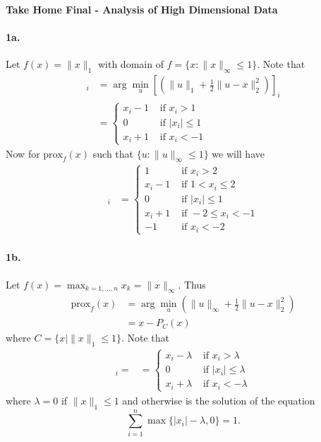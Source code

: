 \documentclass[12pt, leqno]{article}
\providecommand{\abs}[1]{\lvert#1\rvert}
\providecommand{\norm}[1]{\lVert#1\rVert}
\newcommand{\prox}{\mathrm{prox}}
\begin{document}
\pagestyle{fancy}

\begin{center}
{\large {\bf Take Home Final - Analysis of High Dimensional Data}} \\
\end{center}

\paragraph{1a.} Let $f(x) = \norm{x}_1$ with domain of $f =
\{x:\norm{x}_{\infty} \leq 1\}$. 
Note that 
\begin{align*}
  [\prox_{f}(x)]_i &= \arg\min_{u}[(\norm{u}_1 + \frac{1}{2} \norm{u-x}_2^2)]_i\\
  &= \begin{cases} x_i-1 & \text{ if } x_i>1 \\
0 & \text{ if } \abs{x_i} \leq 1 \\
x_i + 1 & \text{ if } x_i<-1
\end{cases}
\end{align*}
Now for $\prox_{f}(x)$ such that $\{u:\norm{u}_{\infty} \leq 1\}$ we
will have  
\begin{align*}
  [\prox_{f}(x)]_i 
  &= \begin{cases} 1 &  \text{ if } x_i>2 \\
x_i - 1 & \text{ if } 1< x_i \leq 2 \\
0 & \text{ if } \abs{x_i} \leq 1 \\
x_i + 1 & \text{ if } -2 \leq x_i<-1 \\
-1 &\text{ if }  x_i<-2 
\end{cases}
\end{align*}

\paragraph{1b.} Let $f(x) = \max_{k=1,...,n} x_k = \norm{x}_{\infty}$.
Thus 
\begin{align*}
\prox_{f} (x) &= \arg\min_{u} (\norm{u}_{\infty} +
               \frac{1}{2}\norm{u-x}_2^2) \\
&= x - P_C(x)
\end{align*}
where $C = \{x|\norm{x}_1 \leq 1\}$.
Note that 
\begin{align*}
[P_C(x)]_i =   &= \begin{cases} x_i-\lambda & \text{ if } x_i>\lambda \\
0 & \text{ if } \abs{x_i} \leq \lambda \\
x_i + \lambda & \text{ if } x_i<-\lambda
\end{cases}
\end{align*}
where $\lambda = 0$ if $\norm{x}_1 \leq 1$ and otherwise is the
solution of the equation 
\[
\sum_{i=1}^n \max\{\abs{x_i}-\lambda,0\} = 1.
\]
\end{document}
